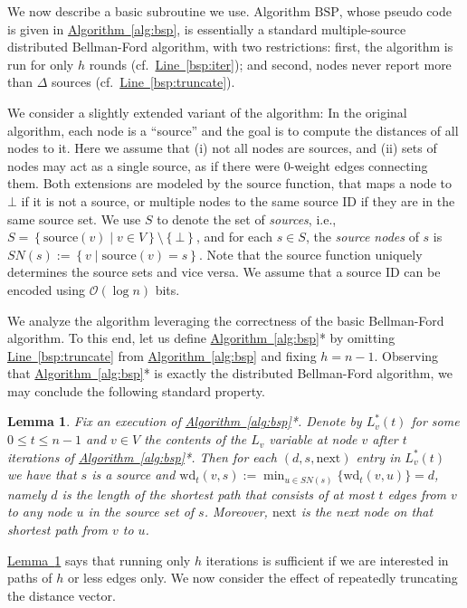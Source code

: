 \documentclass[letterpaper,11pt]{article}
\newcommand{\namedref}[2]{\hyperref[#2]{#1~\ref*{#2}}}
\newcommand{\lemmaref}[1]{\namedref{Lemma}{#1}}
\newcommand{\algref}[1]{\namedref{Algorithm}{#1}}
\newcommand{\lineref}[1]{\namedref{Line}{#1}}
\newtheorem{lemma}[theorem]{Lemma}
\newcommand{\BO}{\mathcal{O}}
\newcommand{\Set}[1]{\left\{ #1 \right\}}
\newcommand{\Src}{\mathrm{source}}
\newcommand{\BSP}{\mathrm{BSP}\xspace}
\newcommand{\Next}{\mathrm{next}}
\newcommand{\Wd}{\mathrm{wd}}
\begin{document}
We now describe a basic subroutine we use. Algorithm
$\BSP$, whose pseudo code is given in \algref{alg:bsp}, is
essentially a standard multiple-source distributed Bellman-Ford
algorithm, with two restrictions: first, the algorithm is run for
only $h$ rounds (cf.\ \lineref{bsp:iter}); and second, nodes never
report more than $\Delta$ sources (cf.\
\lineref{bsp:truncate}).

We consider a slightly extended variant of the algorithm: In the original
algorithm, each node is a ``source'' and the goal is to compute the distances of
all nodes to it. Here we assume that (i) not all nodes are sources, and (ii)
sets of nodes may act as a single source, as if there were 0-weight edges
connecting them. Both extensions are modeled by the $\textrm{source}$ function,
that maps a node to $\bot$ if it is not a source, or multiple nodes to the same
source ID if they are in the same source set. We use $S$ to denote the
set of \emph{sources}, i.e.,  $S=\Set{\Src(v)\mid v\in
  V}\setminus\Set\bot$, and for each $s\in S$,
the \emph{source nodes} of $s$ is $SN(s):=\Set{v\mid \Src(v)=s}$. Note that the
source function uniquely determines the source sets and vice versa. We assume
that a source ID can be encoded using $\BO(\log n)$ bits.

We analyze the algorithm leveraging the correctness of the basic Bellman-Ford
algorithm. To this end, let us define \algref{alg:bsp}* by omitting
\lineref{bsp:truncate} from \algref{alg:bsp} and fixing $h=n-1$. Observing that
\algref{alg:bsp}* is exactly the distributed Bellman-Ford algorithm, we may
conclude the following standard property.

\begin{lemma}\label{lem:bf}
Fix an execution of \algref{alg:bsp}*. Denote by $L_v^*(t)$ for some $0\le t\le
n-1$ and $v\in V$ the contents of the $L_v$ variable at node $v$ after $t$
iterations of \algref{alg:bsp}*. Then for each $(d,s,\Next)$ entry in $L_v^*(t)$
we have that $s$ is a source and $\Wd_t(v,s):=\min_{u\in
SN(s)}\{\Wd_t(v,u)\}=d$, namely $d$ is the length of the shortest path that
consists of at most $t$ edges from $v$ to any node $u$ in the source set of $s$.
Moreover, $\Next$ is the next node on that shortest path from $v$ to $u$.
\end{lemma}

\lemmaref{lem:bf} says that running only $h$ iterations is sufficient if we
are interested in paths of $h$ or less edges only. We now consider the effect of
repeatedly truncating the distance vector.
\end{document}
